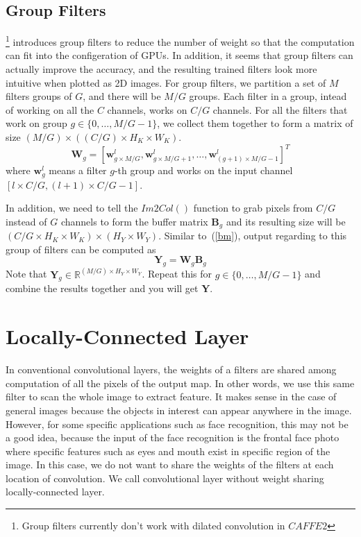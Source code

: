 \documentclass[authordraft=true,dvipsnames]{acmart}
\newcommand{\pref}[1]{(\ref{#1})}
\newcommand{\bw}[0]{\mathbf{W}}
\newcommand{\by}[0]{\mathbf{Y}}
\newcommand{\bb}[0]{\mathbf{B}}
\begin{document}
\subsection{Group Filters}\footnote{Group filters currently don't work with dilated convolution in $CAFFE2$}
\cite{alexnet} introduces group filters to reduce the number of weight so that the computation can fit into the configeration of GPUs. In addition, it seems that group filters can actually improve the accuracy, and the resulting trained filters look more intuitive when plotted as 2D images. For group filters, we partition a set of $M$ filters groups of $G$, and there will be $M/G$ groups. Each filter in a group, intead of working on all the $C$ channels, works on $C/G$ channels. For all the filters that work on group $g \in \{0,\ldots,M/G-1\}$, we collect them together to form a matrix of size $(M/G) \times ((C/G) \times H_K \times W_K)$.
\begin{equation*}
\bw_g = [\mathbf{w}_{g \times M/G}^l, \mathbf{w}_{g\times M/G+1}^l, \ldots, \mathbf{w}_{(g+1) \times M/G-1}^{l}]^T
\end{equation*}
where $\mathbf{w}_g^l$ means a filter $g$-th group and works on the input channel $[l\times C/G, (l+1)\times C/G-1]$.

In addition, we need to tell the $Im2Col()$ function to grab pixels from $C/G$ instead of $G$ channels to form the buffer matrix $\bb_g$ and its resulting size will be $(C/G \times H_K \times W_K) \times (H_Y \times W_Y)$. Similar to~\pref{bm}, output regarding to this group of filters can be computed as 
\begin{equation} \label{bmg}
\by_g = \bw_g \bb_g
\end{equation}
Note that $\by_g \in \mathbb{R} ^ {(M/G) \times H_Y \times W_Y}$. Repeat this for $g \in \{0,\ldots,M/G-1\}$ and combine the results together and you will get $\mathbf{Y}$.

\section{Locally-Connected Layer}
In conventional convolutional layers, the weights of a filters are shared among computation of all the pixels of the output map. In other words, we use this same filter to scan the whole image to extract feature. It makes sense in the case of general images because the objects in interest can appear anywhere in the image. However, for some specific applications such as face recognition, this may not be a good idea, because the input of the face recognition is the frontal face photo where specific features such as eyes and mouth exist in specific region of the image. In this case, we do not want to share the weights of the filters at each location of convolution. We call convolutional layer without weight sharing locally-connected layer.
\end{document}
